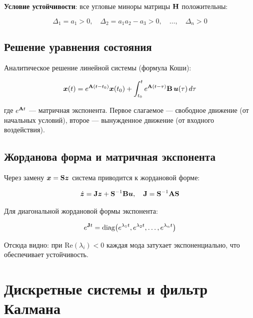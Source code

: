 \textbf{Условие устойчивости}: все угловые миноры матрицы $\mathbf{H}$
положительны:

\begin{equation}
  \Delta_1 = a_1 > 0, \quad
  \Delta_2 = a_1 a_2 - a_3 > 0, \quad
  \ldots, \quad \Delta_n > 0
  \label{eq:hurwitz_cond}
\end{equation}

\subsection{Решение уравнения состояния}

Аналитическое решение линейной системы (формула Коши):

\begin{equation}
  \bm{x}(t) = e^{\mathbf{A}(t - t_0)}\bm{x}(t_0) + \int_{t_0}^{t} e^{\mathbf{A}(t - \tau)}\mathbf{B}\,\bm{u}(\tau)\,d\tau
  \label{eq:cauchy}
\end{equation}

где $e^{\mathbf{A}t}$ --- матричная экспонента. Первое слагаемое ---
свободное движение (от начальных условий), второе ---
вынужденное движение (от входного воздействия).

\subsection{Жорданова форма и матричная экспонента}

Через замену $\bm{x} = \mathbf{S}\bm{z}$ система приводится к жордановой форме:

\begin{equation}
  \dot{\bm{z}} = \mathbf{J}\bm{z} + \mathbf{S}^{-1}\mathbf{B}\bm{u}, \quad
  \mathbf{J} = \mathbf{S}^{-1}\mathbf{A}\mathbf{S}
  \label{eq:jordan}
\end{equation}

Для диагональной жордановой формы экспонента:

\begin{equation}
  e^{\mathbf{J}t} = \mathrm{diag}\!\left(e^{\lambda_1 t}, e^{\lambda_2 t}, \ldots, e^{\lambda_n t}\right)
  \label{eq:matrix_exp}
\end{equation}

Отсюда видно: при $\mathrm{Re}(\lambda_i) < 0$ каждая мода затухает
экспоненциально, что обеспечивает устойчивость.

\section{Дискретные системы и фильтр Калмана}
\label{sec:discrete_kalman}

